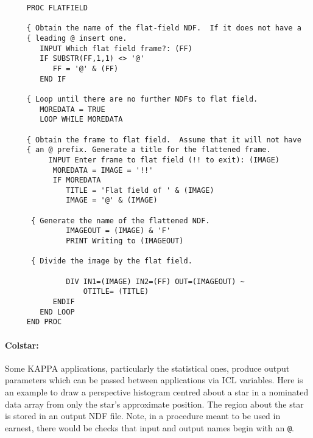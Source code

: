 \begin{small}
\begin{verbatim}
     PROC FLATFIELD

     { Obtain the name of the flat-field NDF.  If it does not have a
     { leading @ insert one.
        INPUT Which flat field frame?: (FF)
        IF SUBSTR(FF,1,1) <> '@'
           FF = '@' & (FF)
        END IF

     { Loop until there are no further NDFs to flat field.
        MOREDATA = TRUE
        LOOP WHILE MOREDATA

     { Obtain the frame to flat field.  Assume that it will not have
     { an @ prefix. Generate a title for the flattened frame.
          INPUT Enter frame to flat field (!! to exit): (IMAGE)
           MOREDATA = IMAGE = '!!'
           IF MOREDATA
              TITLE = 'Flat field of ' & (IMAGE)
              IMAGE = '@' & (IMAGE)

      { Generate the name of the flattened NDF.
              IMAGEOUT = (IMAGE) & 'F'
              PRINT Writing to (IMAGEOUT) 

      { Divide the image by the flat field.

              DIV IN1=(IMAGE) IN2=(FF) OUT=(IMAGEOUT) ~
                  OTITLE= (TITLE)
           ENDIF
        END LOOP
     END PROC
\end{verbatim}
\end{small}

\paragraph{Colstar:}\hfill

Some {\small KAPPA} applications, particularly the statistical ones, produce
output parameters which can be passed between applications via {\small ICL}
variables.
Here is an example to draw a perspective histogram centred about a star in a
nominated data array from only the star's approximate position.
The region about the star is stored in an output NDF file.
Note, in a procedure meant to be used in earnest, there would be checks that
input and output names begin with an {\tt @}.

